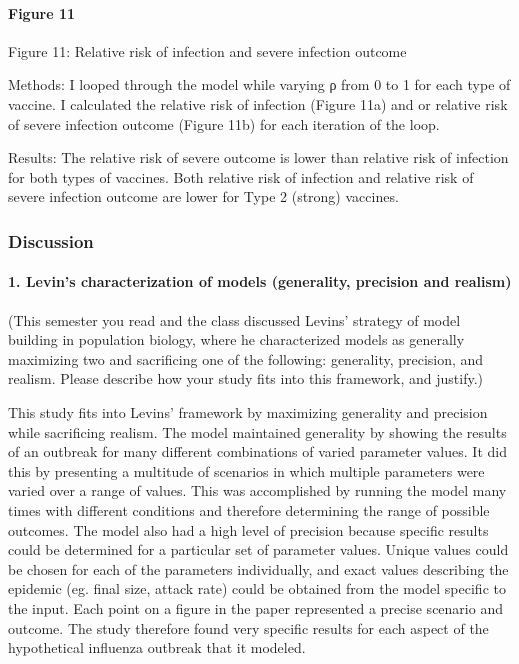 \documentclass[]{article}
\let\oldparagraph\paragraph
\renewcommand{\paragraph}[1]{\oldparagraph{#1}\mbox{}}
\begin{document}
\hypertarget{figure-11}{%
\paragraph{Figure 11}\label{figure-11}}

Figure 11: Relative risk of infection and severe infection outcome

Methods: I looped through the model while varying ρ from 0 to 1 for each
type of vaccine. I calculated the relative risk of infection (Figure
11a) and or relative risk of severe infection outcome (Figure 11b) for
each iteration of the loop.

Results: The relative risk of severe outcome is lower than relative risk
of infection for both types of vaccines. Both relative risk of infection
and relative risk of severe infection outcome are lower for Type 2
(strong) vaccines.

\hypertarget{discussion}{%
\subsubsection{Discussion}\label{discussion}}

\hypertarget{levins-characterization-of-models-generality-precision-and-realism}{%
\paragraph{1. Levin's characterization of models (generality, precision
and
realism)}\label{levins-characterization-of-models-generality-precision-and-realism}}

(This semester you read and the class discussed Levins' strategy of
model building in population biology, where he characterized models as
generally maximizing two and sacrificing one of the following:
generality, precision, and realism. Please describe how your study fits
into this framework, and justify.)

This study fits into Levins' framework by maximizing generality and
precision while sacrificing realism. The model maintained generality by
showing the results of an outbreak for many different combinations of
varied parameter values. It did this by presenting a multitude of
scenarios in which multiple parameters were varied over a range of
values. This was accomplished by running the model many times with
different conditions and therefore determining the range of possible
outcomes. The model also had a high level of precision because specific
results could be determined for a particular set of parameter values.
Unique values could be chosen for each of the parameters individually,
and exact values describing the epidemic (eg. final size, attack rate)
could be obtained from the model specific to the input. Each point on a
figure in the paper represented a precise scenario and outcome. The
study therefore found very specific results for each aspect of the
hypothetical influenza outbreak that it modeled.
\end{document}
